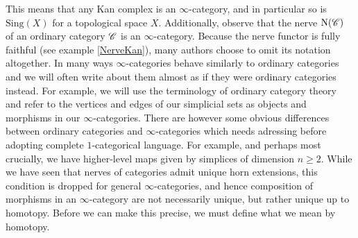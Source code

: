 \documentclass[../../thesis.tex]{subfiles}
\begin{document}
This means that any Kan complex is an $\infty$-category, and in particular so is $\mathrm{Sing}(X)$ for a topological space $X$.
Additionally, observe that the nerve $\mathrm{N}(\mathscr{C})$ of an ordinary category $\mathscr{C}$ is an $\infty$-category.
Because the nerve functor is fully faithful (see example \ref{NerveKan}), many authors choose to omit its notation altogether.
In many ways $\infty$-categories behave similarly to ordinary categories and we will often write about them almost as if they were ordinary categories instead.
For example, we will use the terminology of ordinary category theory and refer to the vertices and edges of our simplicial sets as objects and morphisms in our $\infty$-categories.
There are however some obvious differences between ordinary categories and $\infty$-categories which needs adressing before adopting complete $1$-categorical language.
For example, and perhaps most crucially, we have higher-level maps given by simplices of dimension $n\geq 2$.
While we have seen that nerves of categories admit unique horn extensions, this condition is dropped for general $\infty$-categories, and hence composition of morphisms in an $\infty$-category are not necessarily unique, but rather unique up to homotopy.
Before we can make this precise, we must define what we mean by homotopy.
\end{document}
